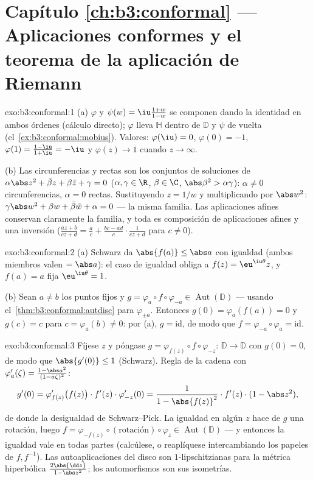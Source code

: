 \section*{Capítulo \ref{ch:b3:conformal} --- Aplicaciones conformes y
el teorema de la aplicación de Riemann}

\begin{solution}{exo:b3:conformal:1}
(a) $\varphi$ y $\psi(w) = \iu\frac{1+w}{1-w}$ se componen dando la
identidad en ambos órdenes (cálculo directo); $\varphi$ lleva
$\mathbb H$ dentro de $\mathbb D$ y $\psi$ de vuelta
(el~\cref{ex:b3:conformal:mobius}). Valores: $\varphi(\iu) = 0$,
$\varphi(0) = -1$, $\varphi(1) = \frac{1 - \iu}{1 + \iu} =
-\iu$ y $\varphi(z) \to 1$ cuando $z \to \infty$.

(b) Las circunferencias y rectas son los conjuntos de soluciones de
$\alpha\abs z^2 + \bar\beta z + \beta\bar z + \gamma = 0$
($\alpha, \gamma \in \R$, $\beta \in \C$, $\abs\beta^2 >
\alpha\gamma$): $\alpha \neq 0$ circunferencias, $\alpha = 0$ rectas.
Sustituyendo $z = 1/w$ y multiplicando por $\abs w^2$:
$\gamma\abs w^2 + \beta w + \bar\beta\bar w + \alpha = 0$ ---
la misma familia. Las aplicaciones afines conservan claramente la
familia, y toda  es composición de aplicaciones
afines y una inversión ($\frac{az+b}{cz+d} = \frac ac + \frac{bc -
ad}{c}\cdot\frac1{cz + d}$ para $c \neq 0$).
\end{solution}

\begin{solution}{exo:b3:conformal:2}
(a) Schwarz da $\abs{f(a)} \leq \abs a$ con igualdad (ambos miembros
valen $= \abs a$): el caso de igualdad obliga a $f(z) =
\eu^{\iu\theta}z$, y $f(a) = a$ fija $\eu^{\iu\theta} = 1$.

(b) Sean $a \neq b$ los puntos fijos y $g =
\varphi_a\circ f\circ\varphi_{-a} \in
\operatorname{Aut}(\mathbb D)$ --- usando
el~\cref{thm:b3:conformal:autdisc} para $\varphi_{\pm a}$. Entonces
$g(0) = \varphi_a(f(a)) = 0$ y $g(c) = c$ para $c =
\varphi_a(b) \neq 0$: por (a), $g = \mathrm{id}$, de modo que $f =
\varphi_{-a}\circ\varphi_a = \mathrm{id}$.
\end{solution}

\begin{solution}{exo:b3:conformal:3}
Fíjese $z$ y póngase $g = \varphi_{f(z)}\circ f\circ\varphi_{-z}$:
$\mathbb D \to \mathbb D$ 
con $g(0) = 0$, de modo que $\abs{g'(0)} \leq 1$ (Schwarz). Regla de la
cadena con
$\varphi_a'(\zeta) = \frac{1 - \abs a^2}{(1 - \bar
a\zeta)^2}$:
\[
g'(0) = \varphi_{f(z)}'\bigl(f(z)\bigr)\cdot f'(z)\cdot
\varphi_{-z}'(0)
= \frac{1}{1 - \abs{f(z)}^2}\cdot f'(z)\cdot(1 - \abs z^2),
\]
de donde la desigualdad de Schwarz--Pick. La igualdad en algún $z$ hace
de $g$ una rotación, luego $f =
\varphi_{-f(z)}\circ(\text{rotación})\circ\varphi_z \in
\operatorname{Aut}(\mathbb D)$ --- y entonces la igualdad vale en todas
partes (calcúlese, o reaplíquese intercambiando los papeles de
$f, f^{-1}$). Las autoaplicaciones
 del disco son
$1$-lipschitzianas para la métrica hiperbólica $\frac{2\abs{\dd
z}}{1 - \abs z^2}$; los automorfismos son sus isometrías.
\end{solution}

